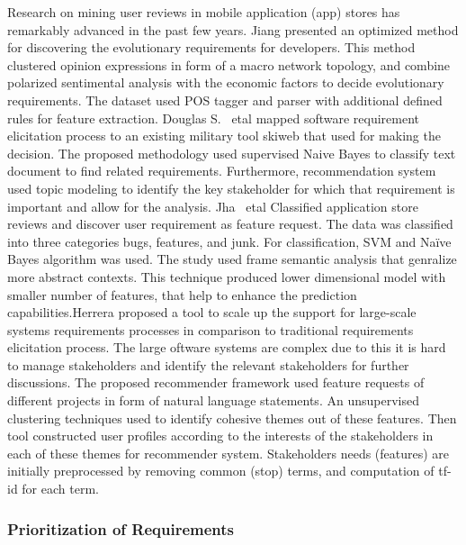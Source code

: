 Research on mining user reviews in mobile application (app) stores has
remarkably advanced in the past few years. Jiang \etal \cite{Jiang:2014}
presented an optimized method for discovering the evolutionary requirements for
developers. This method clustered opinion expressions in form of a macro network
topology, and combine polarized sentimental analysis with the economic factors
to decide evolutionary requirements. The dataset used POS tagger and parser with
additional defined rules for feature extraction. Douglas S. ~etal
\cite{Douglas:S2008} mapped software requirement elicitation process to an
existing military tool skiweb that used for making the decision. The proposed
methodology used supervised Naive Bayes to classify text document to find
related requirements. Furthermore, recommendation system used topic modeling to
identify the key stakeholder for which that requirement is important and allow
for the analysis. Jha ~etal \cite{Jha:2017} Classified application store reviews
and discover user requirement as feature request. The data was classified into
three categories bugs, features, and junk. For classification, SVM and Naïve
Bayes algorithm was used. The study used frame semantic analysis that genralize more abstract contexts. This technique produced lower  dimensional model
with smaller number of features, that help to enhance the prediction capabilities.Herrera\etal\cite{Castro-Herrera:2009} proposed a tool to scale up the support 
for large-scale systems requirements processes in comparison to traditional requirements elicitation process. The large oftware systems are complex due to this 
it is hard to manage stakeholders and identify the relevant stakeholders for further discussions.
The proposed recommender framework used feature requests of different projects in form of natural language statements. 
An unsupervised clustering techniques used to identify cohesive themes out of these features. Then tool constructed user
profiles according to the interests of the stakeholders in each of these themes for recommender system. Stakeholders needs (features) are initially preprocessed by
removing common (stop) terms, and computation of tf-id for each term. 

\subsubsection{Prioritization of Requirements} 

